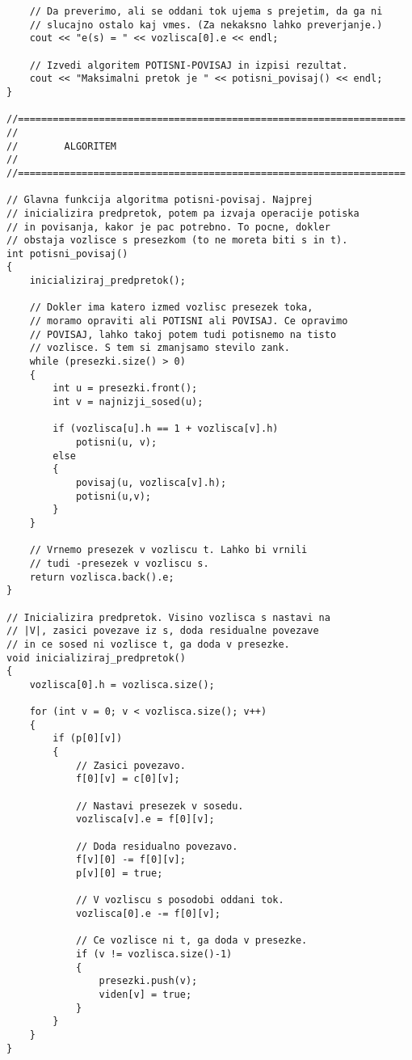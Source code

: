\documentclass[mat1]{fmfdelo}
\begin{document}
\begin{verbatim}
    // Da preverimo, ali se oddani tok ujema s prejetim, da ga ni
    // slucajno ostalo kaj vmes. (Za nekaksno lahko preverjanje.)
    cout << "e(s) = " << vozlisca[0].e << endl;
    
    // Izvedi algoritem POTISNI-POVISAJ in izpisi rezultat.
    cout << "Maksimalni pretok je " << potisni_povisaj() << endl;
}

//===================================================================
//
//        ALGORITEM
//
//===================================================================

// Glavna funkcija algoritma potisni-povisaj. Najprej
// inicializira predpretok, potem pa izvaja operacije potiska
// in povisanja, kakor je pac potrebno. To pocne, dokler
// obstaja vozlisce s presezkom (to ne moreta biti s in t).
int potisni_povisaj()
{
    inicializiraj_predpretok();
    
    // Dokler ima katero izmed vozlisc presezek toka,
    // moramo opraviti ali POTISNI ali POVISAJ. Ce opravimo
    // POVISAJ, lahko takoj potem tudi potisnemo na tisto
    // vozlisce. S tem si zmanjsamo stevilo zank.
    while (presezki.size() > 0)
    {
        int u = presezki.front();
        int v = najnizji_sosed(u);
        
        if (vozlisca[u].h == 1 + vozlisca[v].h)
            potisni(u, v);
        else
        {
            povisaj(u, vozlisca[v].h);
            potisni(u,v);
        }
    }
    
    // Vrnemo presezek v vozliscu t. Lahko bi vrnili
    // tudi -presezek v vozliscu s.
    return vozlisca.back().e;
}

// Inicializira predpretok. Visino vozlisca s nastavi na
// |V|, zasici povezave iz s, doda residualne povezave
// in ce sosed ni vozlisce t, ga doda v presezke.
void inicializiraj_predpretok()
{
    vozlisca[0].h = vozlisca.size();
    
    for (int v = 0; v < vozlisca.size(); v++)
    {
        if (p[0][v])
        {
            // Zasici povezavo.
            f[0][v] = c[0][v];
        
            // Nastavi presezek v sosedu.
            vozlisca[v].e = f[0][v];
        
            // Doda residualno povezavo.
            f[v][0] -= f[0][v];
            p[v][0] = true;
        
            // V vozliscu s posodobi oddani tok.
            vozlisca[0].e -= f[0][v];
        
            // Ce vozlisce ni t, ga doda v presezke.
            if (v != vozlisca.size()-1)
            {
                presezki.push(v);
                viden[v] = true;
            }
        }
    }
}


\end{verbatim}
\end{document}
